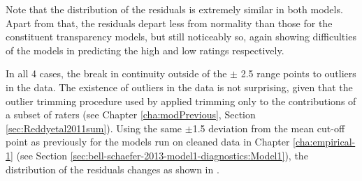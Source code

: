 \pagebreak[4]
Note that the distribution of the residuals is extremely similar in
both models. Apart from that, the residuals depart less from normality
than those for the constituent transparency models, but still
noticeably so, again showing difficulties of the models in predicting
the high and low ratings respectively.

In all 4 cases, the break in continuity 
outside of the $\pm$ 2.5 range points to outliers in the data. 
The existence of outliers in the data is not surprising, given that the outlier trimming procedure used by \citet{Reddyetal:2011} applied trimming only to the contributions of a
subset of raters (see Chapter \ref{cha:modPrevious}, Section
\ref{sec:Reddyetal2011sum}). Using the same $\pm$1.5 deviation from the mean cut-off point as
previously for the models run on cleaned data in Chapter
\ref{cha:empirical-1} (see Section \ref{sec:bell-schaefer-2013-model1-diagnostics:Model1}), the distribution of the residuals changes as
shown in .

